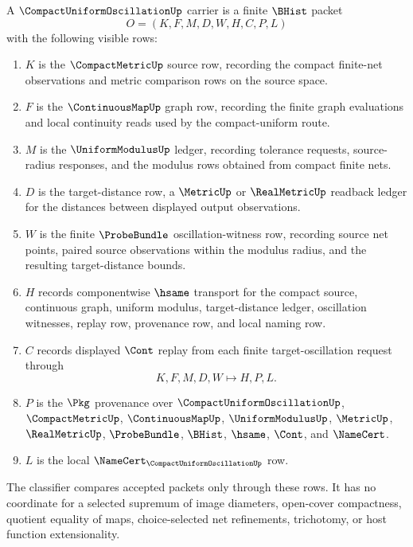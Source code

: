 \begin{definition}
\label{def:compact-uniform-oscillation-carrier}
A $\CompactUniformOscillationUp$ carrier is a finite $\BHist$ packet
$$
O=(K,F,M,D,W,H,C,P,L)
$$
with the following visible rows:
\begin{enumerate}
\item $K$ is the $\CompactMetricUp$ source row, recording the compact finite-net observations and metric comparison rows on the source space.
\item $F$ is the $\ContinuousMapUp$ graph row, recording the finite graph evaluations and local continuity reads used by the compact-uniform route.
\item $M$ is the $\UniformModulusUp$ ledger, recording tolerance requests, source-radius responses, and the modulus rows obtained from compact finite nets.
\item $D$ is the target-distance row, a $\MetricUp$ or $\RealMetricUp$ readback ledger for the distances between displayed output observations.
\item $W$ is the finite $\ProbeBundle$ oscillation-witness row, recording source net points, paired source observations within the modulus radius, and the resulting target-distance bounds.
\item $H$ records componentwise $\hsame$ transport for the compact source, continuous graph, uniform modulus, target-distance ledger, oscillation witnesses, replay row, provenance row, and local naming row.
\item $C$ records displayed $\Cont$ replay from each finite target-oscillation request through
$$
K,F,M,D,W \longmapsto H,P,L .
$$
\item $P$ is the $\Pkg$ provenance over $\CompactUniformOscillationUp$, $\CompactMetricUp$, $\ContinuousMapUp$, $\UniformModulusUp$, $\MetricUp$, $\RealMetricUp$, $\ProbeBundle$, $\BHist$, $\hsame$, $\Cont$, and $\NameCert$.
\item $L$ is the local $\NameCert_{\CompactUniformOscillationUp}$ row.
\end{enumerate}
The classifier compares accepted packets only through these rows. It has no coordinate for a selected supremum of image diameters, open-cover compactness, quotient equality of maps, choice-selected net refinements, trichotomy, or host function extensionality.
\end{definition}


